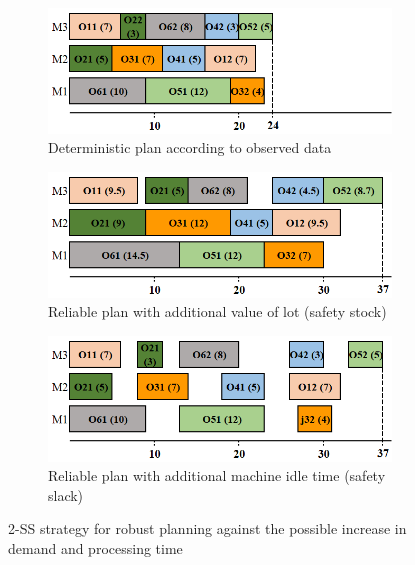 \documentclass[letterpaper]{article} %
\begin{document}
\begin{figure}[t]
\begin{subfigure}{.46\textwidth}
  \centering
  \captionsetup{justification=centering}
  \includegraphics[width=0.9\columnwidth]{figure/fig2-1.png} %
  \caption{Deterministic plan according to observed data}
  \label{fig:fig1-1}
\end{subfigure}
\begin{subfigure}{.46\textwidth}
  \centering
  \captionsetup{justification=centering}
  \includegraphics[width=0.9\columnwidth]{figure/fig2-2.png} %
  \caption{Reliable plan with additional value of lot (safety stock)}
  \label{fig:fig1-2}
\end{subfigure}
\begin{subfigure}{.46\textwidth}
  \centering
  \captionsetup{justification=centering}
  \includegraphics[width=0.9\columnwidth]{figure/fig3-2.png} %
  \caption{Reliable plan with additional machine idle time (safety slack)}
  \label{fig:fig1-3}
\end{subfigure}
\caption{2-SS strategy for robust planning against the possible increase in demand and processing time}
\label{fig2}
\end{figure}
\end{document}
